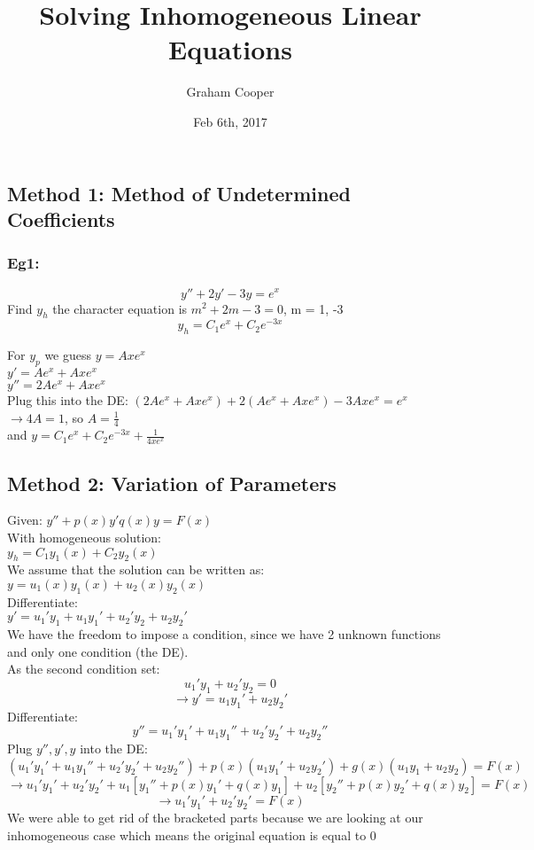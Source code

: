 \documentclass[12pt]{article}
\title{\vspace{-15ex}Solving Inhomogeneous Linear Equations\vspace{-1ex}}
\date{Feb 6th, 2017}
\author{Graham Cooper}
\begin{document}
	\maketitle
	
	\subsection*{Method 1: Method of Undetermined Coefficients}
	\subsubsection*{Eg1:}
	$$y'' + 2y' - 3y = e^x$$
	Find $y_h$ the character equation is $m^2 + 2m - 3 = 0$, m = 1, -3\\
	$$y_h = C_1e^x + C_2e^{-3x}$$
	
	For $y_p$ we guess $y = Axe^x$\\
	$y' = Ae^x + Axe^x$\\
	$y'' = 2Ae^x + Axe^x$\\
	
	Plug this into the DE: $(2Ae^x + Axe^x) + 2(Ae^x + Axe^x) - 3Axe^x = e^x$\\
	$\rightarrow 4A = 1$, so $A = \frac{1}{4}$\\
	and $y = C_1e^x + C_2e^{-3x} + \frac{1}{4xe^x}$\\
	
	\subsection*{Method 2: Variation of Parameters}
	Given: $y'' + p(x)y' q(x)y = F(x)$\\
	With homogeneous solution:\\
	$y_h = C_1y_1(x) + C_2y_2(x)$\\
	We assume that the solution can be written as:\\
	$y = u_1(x)y_1(x) + u_2(x)y_2(x)$\\
	
	Differentiate:\\
	$y' = u_1'y_1 + u_1y_1' + u_2'y_2 + u_2y_2'$\\
	
	We have the freedom to impose a condition, since we have 2 unknown functions and only one condition (the DE).\\
	As the second condition set:\\
	$$u_1'y_1 + u_2'y_2 = 0$$
	$$\rightarrow y' = u_1y_1' + u_2y_2'$$
	Differentiate:\\
	$$y'' = u_1'y_1' + u_1y_1''+u_2'y_2'+u_2y_2''$$
	Plug $y'', y', y$ into the DE:\\
	$$(u_1'y_1' + u_1y_1'' + u_2'y_2' + u_2y_2'') + p(x)(u_1y_1' + u_2y_2') + g(x)(u_1y_1 + u_2y_2) = F(x)$$
	$$\rightarrow u_1'y_1'+u_2'y_2' + u_1[y_1''+p(x)y_1' + q(x)y_1] + u_2[y_2''+p(x)y_2' + q(x)y_2] = F(x)$$
	$$\rightarrow u_1'y_1' + u_2'y_2' = F(x)$$
	We were able to get rid of the bracketed parts because we are looking at our inhomogeneous case which means the original equation is equal to 0\\
	
\end{document}
